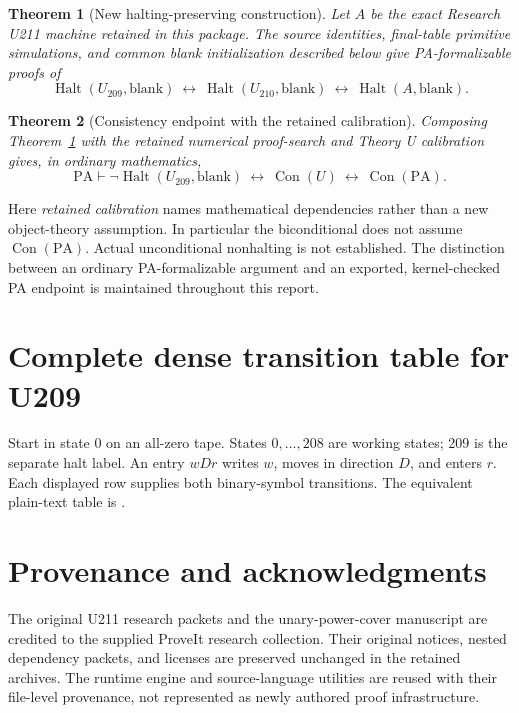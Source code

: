 \documentclass[11pt,letterpaper]{article}
\newtheorem{theorem}{Theorem}[section]
\newcommand{\PA}{\mathrm{PA}}
\newcommand{\Con}{\operatorname{Con}}
\newcommand{\Halt}{\operatorname{Halt}}
\newcommand{\file}[1]{\path{#1}}
\begin{document}
\begin{theorem}[New halting-preserving construction]\label{thm:new}
Let \(A\) be the exact Research U211 machine retained in this package.
The source identities, final-table primitive simulations, and common
blank initialization described below give PA-formalizable proofs of
\[
 \Halt(U_{209},\mathrm{blank})
 \ \longleftrightarrow\
 \Halt(U_{210},\mathrm{blank})
 \ \longleftrightarrow\
 \Halt(A,\mathrm{blank}).
\]
\end{theorem}

\begin{theorem}[Consistency endpoint with the retained calibration]\label{thm:endpoint}
Composing Theorem~\ref{thm:new} with the retained numerical proof-search and
Theory U calibration gives, in ordinary mathematics,
\[
 \PA\vdash
 \neg\Halt(U_{209},\mathrm{blank})
 \ \longleftrightarrow\ \Con(U)
 \ \longleftrightarrow\ \Con(\PA).
\]
\end{theorem}

Here \emph{retained calibration} names mathematical dependencies rather than a
new object-theory assumption. In particular the biconditional does not assume
\(\Con(\PA)\). Actual unconditional nonhalting is not established.
The distinction between an ordinary PA-formalizable argument and an exported,
kernel-checked PA endpoint is maintained throughout this report.





\clearpage
\appendix
\section{Complete dense transition table for U209}\label{app:table}
Start in state 0 on an all-zero tape. States \(0,\ldots,208\) are working
states; 209 is the separate halt label. An entry \(wDr\) writes \(w\), moves
in direction \(D\), and enters \(r\). Each displayed row supplies both
binary-symbol transitions. The equivalent plain-text table is
\file{machine/u209.tm}.


\section{Provenance and acknowledgments}
The original U211 research packets and the unary-power-cover manuscript are
credited to the supplied ProveIt research collection. Their original notices,
nested dependency packets, and licenses are preserved unchanged in the
retained archives. The runtime engine and source-language utilities are
reused with their file-level provenance, not represented as newly authored
proof infrastructure.
\end{document}
